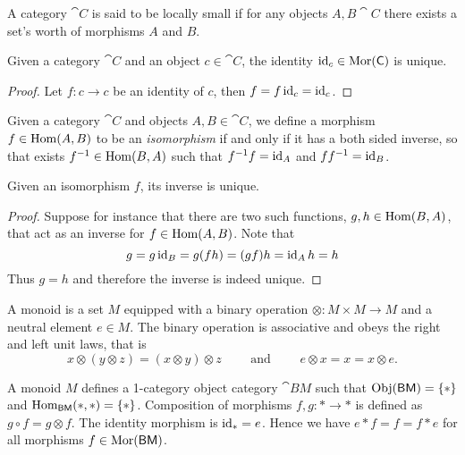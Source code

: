 \begin{definition}
  A category \(\cat C\) is said to be locally small if for any objects \(A,B
  \cat C\) there exists a set's worth of morphisms \(A\) and \(B\).
\end{definition}

\begin{corollary}\label{cor: unique identity}
  Given a category \(\cat C\) and an object \(c \in \cat C\), the identity
  \(\operatorname{id}_c \in \operatorname{Mor}(\mathsf C)\) is unique.
\end{corollary}

\begin{proof}
  Let \(f: c \to c\) be an identity of \(c\), then \(f = f \operatorname{id}_c = \operatorname{id}_c\).
\end{proof}

\begin{definition}
  Given a category \(\cat{C}\) and objects  \(A, B \in \cat{C}\), we
  define a morphism \(f \in \operatorname{Hom}(A, B)\) to be an \emph{isomorphism} if
  and only if it has a both sided inverse, so that exists \(f^{-1} \in
  \operatorname{Hom}(B, A)\) such that \(f^{-1}f = \operatorname{id}_A\) and  \(ff^{-1} =
  \operatorname{id}_B\).
\end{definition}

\begin{proposition}\label{prop: iso unique inverse}
   Given an isomorphism \(f\), its inverse is unique.
\end{proposition}

\begin{proof}
   Suppose for instance that there are two such functions, \(g, h \in 
   \operatorname{Hom}(B, A)\), that act as an inverse for \(f \in \operatorname{Hom}(A,
   B)\). Note that 
   \[
      g = g \operatorname{id}_B = g(f h) = (g f) h = \operatorname{id}_A h = h
   \] 
   Thus \(g = h\) and therefore the inverse is indeed unique.
\end{proof}

\begin{definition}[Monoid]\label{def: monoid}
  A monoid is a set \(M\) equipped with a binary operation \(\otimes: M \times M
  \to M\) and a neutral element \(e \in M\). The binary operation is associative
  and obeys the right and left unit laws, that is
  \[
    x \otimes (y \otimes z) = (x \otimes y) \otimes z \qquad \text{ and } \qquad
    e \otimes x = x = x \otimes e.
  \] 
\end{definition}

\begin{example}
  A monoid \(M\) defines a 1-category object category \(\cat{BM}\) such that
  \(\operatorname{Obj}(\mathsf{BM}) = \{*\}\) and \(\operatorname{Hom}_{\mathsf{BM}}(*, *) = \{*\}\). Composition
  of morphisms \(f, g: * \to *\) is defined as \(g \circ f = g \otimes f\). The
  identity morphism is \(\operatorname{id}_* = e\). Hence we have \(e * f = f = f * e\) for
  all morphisms \(f \in \operatorname{Mor}(\mathsf{BM})\).
\end{example}

